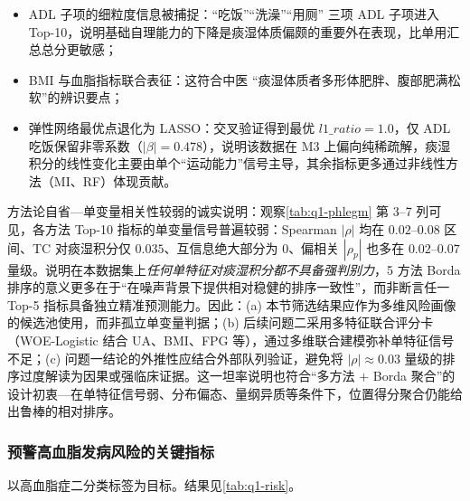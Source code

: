 \documentclass{MathorCupmodeling}
\providecommand{\tightlist}{%
  \setlength{\itemsep}{0pt}\setlength{\parskip}{0pt}}
\begin{document}
\begin{itemize}
\tightlist
\item ADL 子项的细粒度信息被捕捉：``吃饭''``洗澡''``用厕'' 三项 ADL 子项进入 Top-10，说明基础自理能力的下降是痰湿体质偏颇的重要外在表现，比单用汇总总分更敏感；
\item BMI 与血脂指标联合表征：这符合中医 ``痰湿体质者多形体肥胖、腹部肥满松软''的辨识要点；
\item 弹性网络最优点退化为 LASSO：交叉验证得到最优 $l1\_ratio=1.0$，仅 ADL 吃饭保留非零系数（$|\beta|=0.478$），说明该数据在 M3 上偏向纯稀疏解，痰湿积分的线性变化主要由单个``运动能力''信号主导，其余指标更多通过非线性方法（MI、RF）体现贡献。
\end{itemize}

方法论自省---单变量相关性较弱的诚实说明：观察\cref{tab:q1-phlegm} 第 3--7 列可见，各方法 Top-10 指标的单变量信号普遍较弱：Spearman $|\rho|$ 均在 $0.02$--$0.08$ 区间、TC 对痰湿积分仅 $0.035$、互信息绝大部分为 $0$、偏相关 $|\rho_p|$ 也多在 $0.02$--$0.07$ 量级。说明在本数据集上\emph{任何单特征对痰湿积分都不具备强判别力}，5 方法 Borda 排序的意义更多在于``在噪声背景下提供相对稳健的排序一致性''，而非断言任一 Top-5 指标具备独立精准预测能力。因此：(a) 本节筛选结果应作为多维风险画像的候选池使用，而非孤立单变量判据；(b) 后续问题二采用多特征联合评分卡（WOE-Logistic 结合 UA、BMI、FPG 等），通过多维联合建模弥补单特征信号不足；(c) 问题一结论的外推性应结合外部队列验证，避免将 $|\rho|\approx 0.03$ 量级的排序过度解读为因果或强临床证据。这一坦率说明也符合``多方法 $+$ Borda 聚合''的设计初衷---在单特征信号弱、分布偏态、量纲异质等条件下，位置得分聚合仍能给出鲁棒的相对排序。

\subsubsection{预警高血脂发病风险的关键指标}

以高血脂症二分类标签为目标。结果见\cref{tab:q1-risk}。
\end{document}
